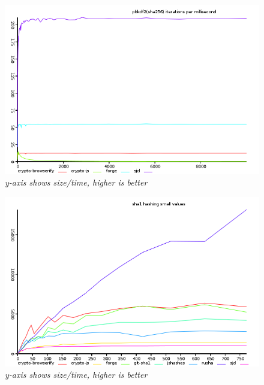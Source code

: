 \begin{figure}[htpb]
\centering
\caption{\small \sl y-axis shows size/time, higher is better
\label{fig:pbkdf2-ops-sha256}}
\includegraphics[scale=0.6]{graphs/pbkdf2-ops-sha256.png}
\end{figure}

\begin{figure}[htpb]
\centering
\includegraphics[scale=0.6]{graphs/small-hash-sha1.png}
\caption{\small \sl y-axis shows size/time, higher is better
\label{fig:small-hash-sha1}}
\end{figure}

